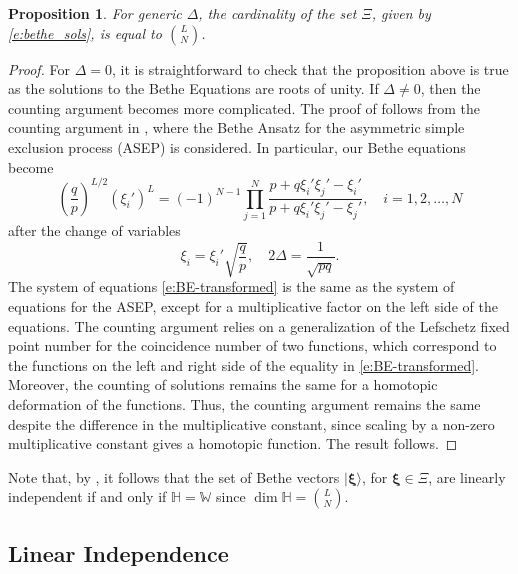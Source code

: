 \documentclass[a4paper,11pt]{article}
\newtheorem{proposition}[theorem]{Proposition}
\theoremstyle{definition}
\begin{document}
\begin{proposition}\label{p:cardinality}
    For generic $\Delta$, the cardinality of the set $\Xi$, given by \eqref{e:bethe_sols}, is equal to $\binom{L}{N}$.
\end{proposition}

\begin{proof}
For $\Delta =0$, it is straightforward to check that the proposition above is true as the solutions to the Bethe Equations are roots of unity. If $\Delta \neq 0$, then the counting argument becomes more complicated. The proof of  follows from the counting argument in \cite[Sec.~4.3]{brattain_completeness_2017}, where the  Bethe Ansatz for the asymmetric simple exclusion process (ASEP) is considered. In particular, our Bethe equations become
\begin{equation}\label{e:BE-transformed}
    \left(\frac{q}{p}\right)^{L/2}(\xi_i')^L = (-1)^{N-1} \prod_{j=1}^N \frac{p + q \xi_i' \xi_j' - \xi_i'}{p + q \xi_i' \xi_j' - \xi_j'}, \quad i=1, 2, \dots, N
\end{equation}
after the change of variables \begin{equation}
    \xi_i=\xi_i'\sqrt{\frac{q}{p}}, \quad 2\Delta=\frac{1}{\sqrt{pq}}.
\end{equation}
The system of equations \eqref{e:BE-transformed} is the same as the system of equations for the ASEP, except for a multiplicative factor on the left side of the equations. The counting argument relies on a generalization of the Lefschetz fixed point number for the coincidence number of two functions, which correspond to the functions on the left and right side of the equality in \eqref{e:BE-transformed}. Moreover, the counting of solutions remains the same for a homotopic deformation of the functions. Thus, the counting argument remains the same despite the difference in the multiplicative constant, since scaling by a non-zero multiplicative constant gives a homotopic function. The result follows.
\end{proof}

Note that, by , it follows that the set of Bethe vectors $|\boldsymbol{\xi} \rangle$, for $\boldsymbol{\xi} \in \Xi$, are linearly independent if and only if $\mathbb{H} = \mathbb{W}$ since $\dim \mathbb{H} = \binom{L}{N}$.



\subsection{Linear Independence}\label{s:linear_independence}
\end{document}
